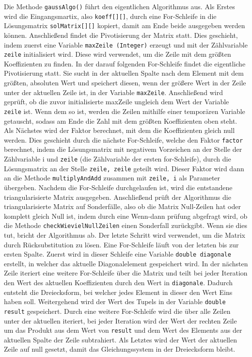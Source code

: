 \documentclass[a4paper, 12pt]{report}
\begin{document}
Die Methode \texttt{gaussAlgo()} führt den eigentlichen Algorithmus aus.
Als Erstes wird die Eingangsmartix, also \texttt{koeff[][]}, durch eine For-Schleife in die Lösungsmatrix \texttt{solMatrix[][]} kopiert, damit am Ende
beide ausgegeben werden können.
Anschließend findet die Pivotisierung der Matrix statt. Dies geschieht, indem zuerst
eine Variable \texttt{maxZeile (Integer)} erzeugt und mit der Zählvariable \texttt{zeile} initialisiert wird.
Diese wird verwendet, um die Zeile mit dem größten Koeffizienten zu finden.
In der darauf folgenden For-Schleife findet die eigentliche Pivotisierung statt.
Sie sucht in der aktuellen Spalte nach dem Element mit dem größten, absoluten Wert
und speichert diesen, wenn der größere Wert in der Zeile unter der aktuellen Zeile ist, in der Variable \texttt{maxZeile}.
Anschließend wird geprüft, ob die zuvor initialisierte maxZeile ungleich dem Wert der Variable \texttt{zeile} ist.
Wenn dem so ist, werden die Zeilen mithilfe einer temporären Variable getauscht, sodass am Ende die
Zahl mit dem größten Koeffizienten oben steht.
Als Nächstes wird der Faktor berechnet, mit dem die Koeffizienten gleich null werden.
Dies geschieht durch die nächste For-Schleife, welche den Faktor \texttt{factor} berechnet, indem die Lösungsmatrix mit negativem Vorzeichen an der Stelle der Zählvariable i
und \texttt{zeile} (die Zählvariable der ersten for-Schleife), durch die Lösungsmatrix an der Stelle \texttt{zeile, zeile} geteilt wird.
Dieser Faktor wird dann an die Methode \texttt{multiplyAndAdd} zusammen mit \texttt{zeile, i} als Parameter übergeben. Nachdem
die For-Schleife durchgelaufen ist, wird die entstandene triangularisierte Matrix  ausgegeben. \newline Anschließend prüft der Algorithmus
die triangularisierte Matrix auf Sonderfälle, also ob die Matrix Null-Zeilen hat oder komplett gleich Null ist, indem durch eine Wenn-dann prüfung
abgefragt wird, ob die Methode \texttt{checkWievielNullZeilen} einen Sonderfall zurückgibt. Wenn sie dies tut, bricht der Algorithmus ab. \newline
Der letzte Schritt wird verwendet, um die Matrix durch Rücksubstitution zu lösen.
Eine For-Schleife läuft von der letzten bis zur ersten Spalte. Zuerst wird in dieser Schleife eine Variable \texttt{double diagonale}
erstellt, in welcher das aktuelle Diagonalelement gespeichert wird. In der nächsten Zeile iteriert eine weitere For-Schleife
über die Matrix und teilt bei jeder Iteration den Wert des aktuellen Koeffizienten durch den Wert in \texttt{diagonale}.
Dadurch entsteht die Dreiecksform, bei welcher jedes Element in dieser den Wert Eins haben soll.
Weitergehend wird der Wert des Tupels in der Variable \texttt{double result} gespeichert.
Durch eine weitere For-Schleife wird die über alle Zeilen unter der aktuellen iteriert, bei jeder Iteration wird der Wert
der rechten Zeile um das Produkt aus dem Wert von \texttt{result} und dem Wert des Elements aus der aktuellen Spalte der Zeile
subtrahiert. Als Letztes wird der Wert der aktuellen Zeile auf null gesetzt, damit das Gleichungssystem in der Dreiecksform
bleibt.
\end{document}
